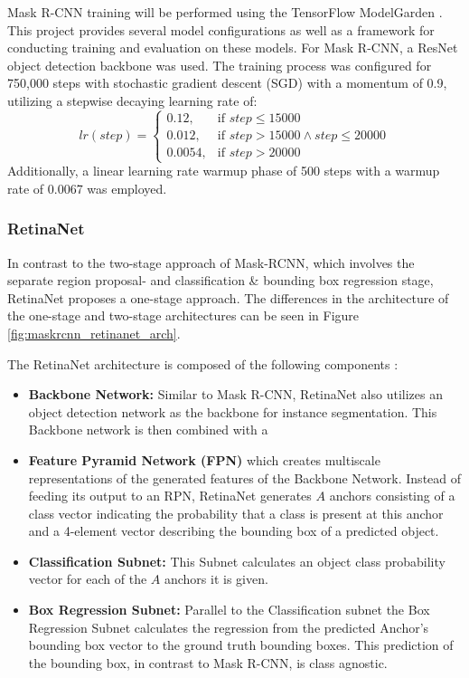 \documentclass[draft,final]{vutinfth} %
\begin{document}
Mask R-CNN training will be performed using the TensorFlow ModelGarden \cite{yu_tensorflow_2020}. This project provides several model configurations as well as a framework for conducting training and evaluation on these models. For Mask R-CNN, a ResNet object detection backbone was used. The training process was configured for 750,000 steps with stochastic gradient descent (SGD) with a momentum of 0.9, utilizing a stepwise decaying learning rate of:
\[
    lr(step)= 
\begin{cases}
    0.12,& \text{if } step \leq 15000\\
    0.012,& \text{if } step > 15000 \land step \leq 20000\\
    0.0054,& \text{if } step > 20000
\end{cases}
\]
Additionally, a linear learning rate warmup phase of 500 steps with a warmup rate of 0.0067 was employed.

\subsubsection{RetinaNet}
In contrast to the two-stage approach of Mask-RCNN, which involves the separate region proposal- and classification \& bounding box regression stage, RetinaNet proposes a one-stage approach. The differences in the architecture of the one-stage and two-stage architectures can be seen in Figure \ref{fig:maskrcnn_retinanet_arch}.

The RetinaNet architecture is composed of the following components \cite{lin_focal_2018}:

\begin{itemize}
    \item \textbf{Backbone Network:} Similar to Mask R-CNN, RetinaNet also utilizes an object detection network as the backbone for instance segmentation. This Backbone network is then combined with a
    \item \textbf{Feature Pyramid Network (FPN)} which creates multiscale representations of the generated features of the Backbone Network. Instead of feeding its output to an RPN, RetinaNet generates $A$ anchors consisting of a class vector indicating the probability that a class is present at this anchor and a 4-element vector describing the bounding box of a predicted object.
    \item \textbf{Classification Subnet:} This Subnet calculates an object class probability vector for each of the $A$ anchors it is given. 
    \item \textbf{Box Regression Subnet:} Parallel to the Classification subnet the Box Regression Subnet calculates the regression from the predicted Anchor's bounding box vector to the ground truth bounding boxes. This prediction of the bounding box, in contrast to Mask R-CNN, is class agnostic.
\end{itemize}
\end{document}
